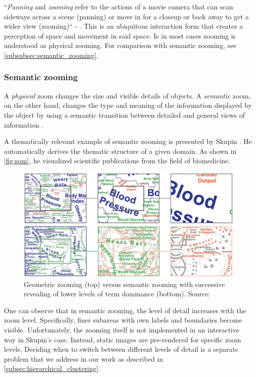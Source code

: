 ``\textit{Panning} and \textit{zooming} refer to the actions of a movie camera that can scan sideways across a scene (panning) or move in for a closeup or back away to get a wider view (zooming)`` - \cite{hearst1999modern}.
This is an ubiquitous interaction form that creates a perception of space and movement in said space.
Is in most cases zooming is understood as physical zooming. For comparison with semantic zooming, see \autoref{subsubsec:semantic_zooming}.

\subsubsection{Semantic zooming}
\label{subsubsec:semantic_zooming}

A \textit{physical} zoom changes the size and visible details of objects. 
A \textit{semantic} zoom, on the other hand, changes the type and meaning of the information displayed by the object by using a semantic transition between detailed and general views of information \cite{Modjeska97}.

A thematically relevant example of semantic zooming is presented by Skupin \cite{Skupin2013}.
He automatically derives the thematic structure of a given domain.
As shown in \autoref{fig:som}, he visualized scientific publications from the field of biomedicine.

\begin{figure}
\includegraphics[width=\textwidth]{img/preview}
\caption{Geometric zooming (top) versus semantic zooming with successive revealing of lower levels of term dominance (bottom). Source: \cite{Skupin2013}}
\label{fig:som}
\end{figure}

One can observe that in semantic zooming, the level of detail increases with the zoom level.
Specifically, finer subareas with own labels and boundaries become visible.
Unfortunately, the zooming itself is not implemented in an interactive way in Skupin's case.
Instead, static images are pre-rendered for specific zoom levels.
Deciding when to switch between different levels of detail is a separate problem that we address in our work as described in \autoref{subsec:hierarchical_clustering}.

